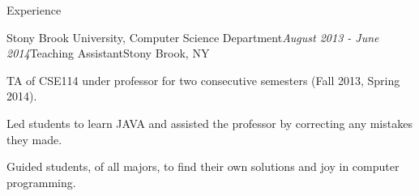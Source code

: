 \documentclass{resume} %
\begin{document}
\begin{rSection}{Experience}
\begin{rSubsection}{Stony Brook University, Computer Science Department}{\em August 2013 - June 2014}{Teaching Assistant}{Stony Brook, NY}
\item TA of CSE114 under professor for two consecutive semesters (Fall 2013, Spring 2014).
\item Led students to learn JAVA and assisted the professor by correcting any mistakes they made.
\item Guided students, of all majors, to find their own solutions and joy in computer programming.
\end{rSubsection}





\end{rSection}
\end{document}
